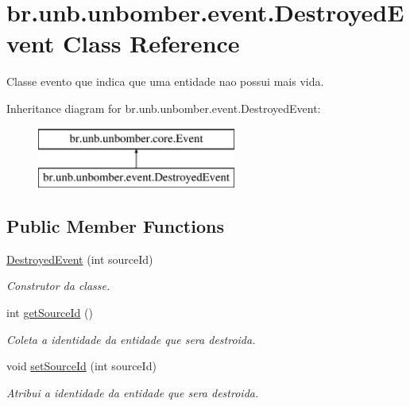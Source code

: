 \hypertarget{classbr_1_1unb_1_1unbomber_1_1event_1_1_destroyed_event}{\section{br.\+unb.\+unbomber.\+event.\+Destroyed\+Event Class Reference}
\label{classbr_1_1unb_1_1unbomber_1_1event_1_1_destroyed_event}
}


Classe evento que indica que uma entidade nao possui mais vida.  


Inheritance diagram for br.\+unb.\+unbomber.\+event.\+Destroyed\+Event\+:\begin{figure}[H]
\begin{center}
\leavevmode
\includegraphics[height=2.000000cm]{classbr_1_1unb_1_1unbomber_1_1event_1_1_destroyed_event}
\end{center}
\end{figure}
\subsection*{Public Member Functions}
\begin{DoxyCompactItemize}
\item 
\hyperlink{classbr_1_1unb_1_1unbomber_1_1event_1_1_destroyed_event_a19c14cf2b960fd3edf9fd9021e18d4b5}{Destroyed\+Event} (int source\+Id)
\begin{DoxyCompactList}\small\item\em Construtor da classe. \end{DoxyCompactList}\item 
int \hyperlink{classbr_1_1unb_1_1unbomber_1_1event_1_1_destroyed_event_a953285b96992a55fd31d1854024d891e}{get\+Source\+Id} ()
\begin{DoxyCompactList}\small\item\em Coleta a identidade da entidade que sera destroida. \end{DoxyCompactList}\item 
void \hyperlink{classbr_1_1unb_1_1unbomber_1_1event_1_1_destroyed_event_a1b479b0502305ecd1bba85857cf7c8cb}{set\+Source\+Id} (int source\+Id)
\begin{DoxyCompactList}\small\item\em Atribui a identidade da entidade que sera destroida. \end{DoxyCompactList}\end{DoxyCompactItemize}


